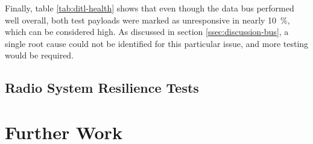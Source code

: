 Finally, table \ref{tab:ditl-health} shows that even though the data bus
performed well overall, both test payloads were marked as unresponsive in
nearly \SI{10}{\percent}, which can be considered high. As discussed in section
\ref{ssec:discussion-bus}, a single root cause could not be identified for this
particular issue, and more testing would be required.

\subsection{Radio System Resilience Tests}



\section{Further Work} %